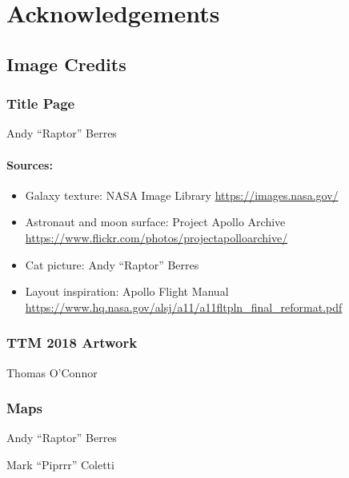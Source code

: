 \chapter{Acknowledgements}
\section*{Image Credits}

\subsection*{Title Page} 
Andy ``Raptor'' Berres

\subsubsection*{Sources:}
\begin{itemize}[noitemsep]
  \item Galaxy texture: NASA Image Library \url{https://images.nasa.gov/}
  \item Astronaut and moon surface: Project Apollo Archive \url{https://www.flickr.com/photos/projectapolloarchive/}
  \item Cat picture: Andy ``Raptor'' Berres
  \item Layout inspiration: Apollo Flight Manual \url{https://www.hq.nasa.gov/alsj/a11/a11fltpln_final_reformat.pdf}
\end{itemize}
\vfill\null

\subsection*{TTM 2018 Artwork}
Thomas O'Connor

\subsection*{Maps}
\begin{description}[leftmargin=6em,noitemsep,style=nextline]
	\item[Direction maps:] Andy ``Raptor'' Berres
	\item[Inside back cover map:] Mark ``Piprrr'' Coletti
\end{description}

\columnbreak



